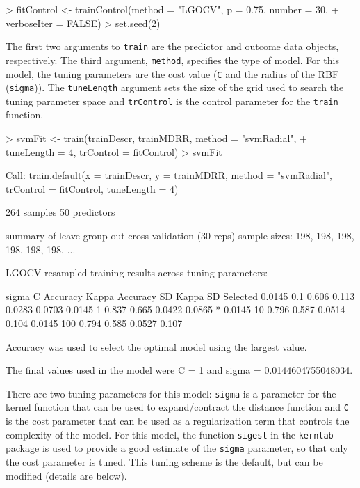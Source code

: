 \documentclass[12pt]{article}
\begin{document}
\begin{small}
\begin{Schunk}
\begin{Sinput}
> fitControl <- trainControl(method = "LGOCV", p = 0.75, number = 30, 
+     verboseIter = FALSE)
> set.seed(2)
\end{Sinput}
\end{Schunk}
\end{small}


The first two arguments to \texttt{train} are the predictor and outcome data objects, respectively. The third argument, \texttt{method}, specifies the type of model. For this model, the tuning parameters are the cost value (\texttt{C} and the radius of the RBF (\texttt{sigma})). The \texttt{tuneLength} argument sets the size of the grid used to search the tuning parameter space and \texttt{trControl} is the control parameter for the \texttt{train} function. 

\begin{small}
\begin{Schunk}
\begin{Sinput}
> svmFit <- train(trainDescr, trainMDRR, method = "svmRadial", 
+     tuneLength = 4, trControl = fitControl)
> svmFit
\end{Sinput}
\begin{Soutput}
Call:
train.default(x = trainDescr, y = trainMDRR, method = "svmRadial", 
    trControl = fitControl, tuneLength = 4)

264 samples
50 predictors

summary of leave group out cross-validation (30 reps) sample sizes:
    198, 198, 198, 198, 198, 198, ... 

LGOCV resampled training results across tuning parameters:

  sigma   C    Accuracy  Kappa  Accuracy SD  Kappa SD  Selected
  0.0145  0.1  0.606     0.113  0.0283       0.0703            
  0.0145  1    0.837     0.665  0.0422       0.0865    *       
  0.0145  10   0.796     0.587  0.0514       0.104             
  0.0145  100  0.794     0.585  0.0527       0.107             

Accuracy was used to select the optimal model using the largest value.

The final values used in the model were C = 1 and sigma = 0.0144604755048034.
\end{Soutput}
\end{Schunk}
\end{small}


There are two tuning parameters for this model: \texttt{sigma} is a parameter for the kernel function that can be used to expand/contract the distance function and \texttt{C} is the cost parameter that can be used as a regularization term that controls the complexity of the model. For this model, the function \texttt{sigest} in the \texttt{kernlab} package is used to provide a good estimate of the \texttt{sigma} parameter, so that only the cost parameter is tuned. This tuning scheme is the default, but can be modified (details are below). 
\end{document}
